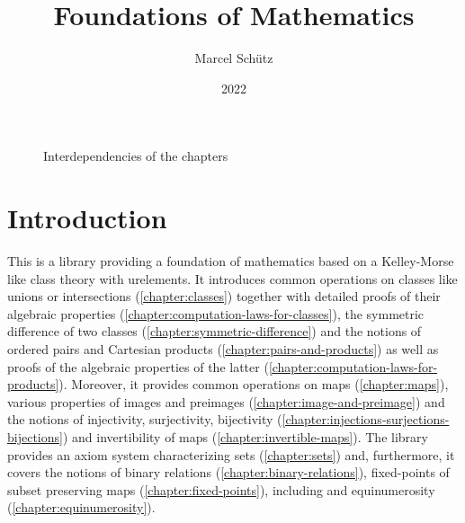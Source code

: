 \documentclass[12pt,oneside]{book}
\title{Foundations of Mathematics}
\author{Marcel Schütz}
\date{2022}
\begin{document}
  \maketitle

  \tableofcontents

  \begin{figure}[H]
    \centering
    \caption*{Interdependencies of the chapters}
  \end{figure}


  \section*{Introduction}

  This is a library providing a foundation of mathematics based on a
  Kelley-Morse like class theory with urelements.
  It introduces common operations on classes like unions or intersections
  (\cref{chapter:classes}) together with detailed proofs of their algebraic
  properties (\cref{chapter:computation-laws-for-classes}), the symmetric
  difference of two classes (\cref{chapter:symmetric-difference}) and the
  notions of ordered pairs and Cartesian products
  (\cref{chapter:pairs-and-products}) as well as proofs of the algebraic
  properties of the latter (\cref{chapter:computation-laws-for-products}).
  Moreover, it provides common operations on maps (\cref{chapter:maps}), various
  properties of images and preimages (\cref{chapter:image-and-preimage}) and the
  notions of injectivity, surjectivity, bijectivity
  (\cref{chapter:injections-surjections-bijections}) and invertibility of maps
  (\cref{chapter:invertible-maps}).
  The library provides an axiom system characterizing sets (\cref{chapter:sets})
  and, furthermore, it covers the notions of binary relations
  (\cref{chapter:binary-relations}), fixed-points of subset preserving maps
  (\cref{chapter:fixed-points}), including and equinumerosity
  (\cref{chapter:equinumerosity}).
\end{document}
